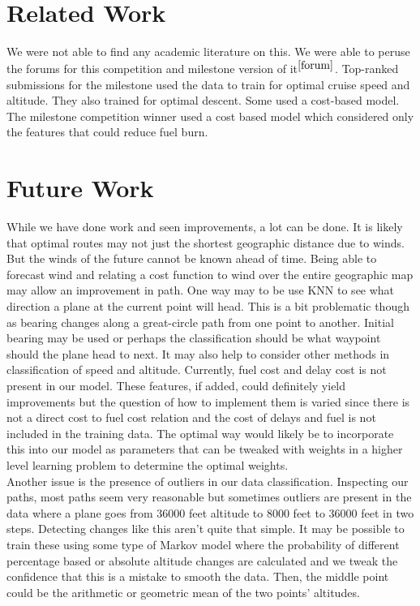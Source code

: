 \documentclass{article}[12pt]
\begin{document}
\begin{multicols}{2}
\section{Related Work}
We were not able to find any academic literature on this. We were able to peruse the forums for this competition and milestone version of it$^{\cite{forum}}$. Top-ranked submissions for the milestone used the data to train for optimal cruise speed and altitude. They also trained for optimal descent. Some used a cost-based model. The milestone competition winner used a cost based model which considered only the features that could reduce fuel burn.

\section{Future Work}
While we have done work and seen improvements, a lot can be done. It is likely that optimal routes may not just the shortest geographic distance due to winds. But the winds of the future cannot be known ahead of time. Being able to forecast wind and relating a cost function to wind over the entire geographic map may allow an improvement in path. One way may to be use KNN to see what direction a plane at the current point will head. This is a bit problematic though as bearing changes along a great-circle path from one point to another. Initial bearing may be used or perhaps the classification should be what waypoint should the plane head to next. It may also help to consider other methods in classification of speed and altitude. Currently, fuel cost and delay cost is not present in our model. These features, if added, could definitely yield improvements but the question of how to implement them is varied since there is not a direct cost to fuel cost relation and the cost of delays and fuel is not included in the training data. The optimal way would likely be to incorporate this into our model as parameters that can be tweaked with weights in a higher level learning problem to determine the optimal weights. \\

Another issue is the presence of outliers in our data classification. Inspecting our paths, most paths seem very reasonable but sometimes outliers are present in the data where a plane goes from 36000 feet altitude to 8000 feet to 36000 feet in two steps. Detecting changes like this aren't quite that simple. It may be possible to train these using some type of Markov model where the probability of different percentage based or absolute altitude changes are calculated and we tweak the confidence that this is a mistake to smooth the data. Then, the middle point could be the arithmetic or geometric mean of the two points' altitudes.


\end{multicols}
\end{document}
